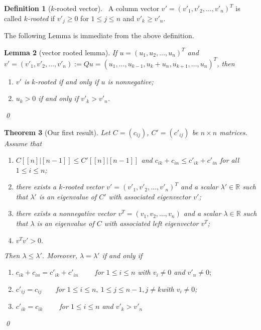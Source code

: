 \documentclass{article}
\theoremstyle{plain}
\newtheorem{thm}{Theorem}[chapter]
\newtheorem{lem}[thm]{Lemma}
\theoremstyle{definition}
\newtheorem{defn}[thm]{Definition}
\begin{document}
\begin{defn}[$k$-rooted vector]
~A column vector $v'=(v'_1,v'_2,\ldots,v'_n)^T$ is called {\it $k$-rooted}  if $v'_{j} \geq 0$ for $1 \leq  j \leq n$ and $v'_k\geq v'_n.$
\end{defn}
\bigskip

The following Lemma is immediate from the above definition.
\bigskip

\begin{lem}[vector rooted lemma]\label{v_rooted}
If $u=(u_1, u_2, \ldots, u_n)^T$ and $v'=(v'_1, v'_2, \ldots, v'_n):=Qu=(u_1,\ldots, u_{k-1},u_k+u_n, u_{k+1}, \ldots,  u_n)^T$, then
\begin{enumerate}
\item[(i)] $v'$ is $k$-rooted  if and only if  $u$ is nonnegative;
\item[(ii)] $u_k>0$ if and only if $v'_k>v'_n$.
\end{enumerate}
\qed
\end{lem}

\begin{thm}[Our first result]\label{thm_main}
    Let $C=(c_{ij})$, $C'=(c'_{ij})$ be  $n\times n$ matrices.
Assume that
\begin{enumerate}
\item[(i)]   $C[[n]|[n-1]]\leq C'[[n]|[n-1]]$ and $c_{ik}+c_{in}\leq c'_{ik}+c'_{in}$ for all $1\leq i\leq n$;
\item[(ii)] there exists a $k$-rooted vector $v'=(v'_1, v'_2, \ldots, v'_n)^T$ and a scalar $\lambda'\in \mathbb{R}$
such that $\lambda'$ is an eigenvalue of $C'$ with associated eigenvector $v'$;
\item[(iii)] there exists a nonnegative vector $v^T=(v_1, v_2, \ldots, v_n)$ and a scalar $\lambda\in \mathbb{R}$ such that $\lambda$ is an eigenvalue of $C$ with associated left eigenvector $v^T$;
\item[(iv)] $v^Tv'>0.$
\end{enumerate}
 Then $\lambda\leq \lambda'$.
Moreover, $\lambda=\lambda'$
if and only if
\begin{enumerate}
    \item[(a)]    $c_{ik}+c_{in}=c'_{ik}+c'_{in} \qquad$  for $1\leq i\leq n$ with $v_i\not=0$ and $v'_n\not=0;$
    \item[(b)]  $c'_{ij}=c_{ij}\qquad $for $1\leq i\leq n,~1\leq j\leq n-1, j \neq k $with $v_i\ne 0 $;
    \item[(c)]   $c'_{ik}=c_{ik} \qquad $  for $1\leq i \leq n$ and $ v'_{k}>v'_n$ 
\end{enumerate} \qed
\end{thm}
% 
\end{document}
